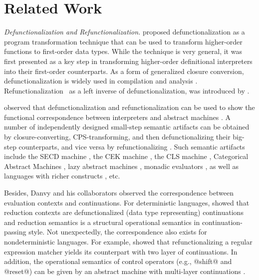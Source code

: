 \documentclass[acmsmall, review]{acmart}\settopmatter{}
\begin{document}
\section{Related Work}\label{sec:related}

\textit{Defunctionalization and Refunctionalization.}
\citet{Reynolds:72} proposed defunctionalization as a program transformation 
technique that can be used to transform higher-order functions to first-order data types. 
While the technique is very general, it was first presented as a key step in
transforming higher-order definitional interpreters into their first-order 
counterparts.
As a form of generalized closure conversion,
defunctionalization is widely used in compilation and analysis \cite{pottier2006polymorphic, 
Eisenberg:2014:PFT:2633357.2633361, fourtounis2014modular, 10.1007/3-540-46425-5_4, consel1993tour}.
Refunctionalization~\cite{Danvy:2006:RW:2171265.2171268} as a 
left inverse of defunctionalization, was introduced 
by \citeauthor{Danvy:2006:RW:2171265.2171268,DANVY2009534}.

 observed that defunctionalization and refunctionalization
can be used to show the functional correspondence between interpreters and abstract machines
\cite{Ager:2003:FCE:888251.888254}. A number of independently designed small-step semantic artifacts can 
be obtained by closure-converting, CPS-transforming, and then defunctionalizing their big-step counterparts, 
and vice versa by refunctionalizing \cite{DANVY2009534}. 
Such semantic artifacts include the SECD machine \cite{10.1007/11431664_4, Ager:2003:FCE:888251.888254, DanvySECDJ},
the CEK machine \cite{Ager:2003:FCE:888251.888254}, the CLS machine  \cite{Ager:2003:FCE:888251.888254},
Categorical Abstract Machines \cite{Ager:2003:FCE:888251.888254}, lazy abstract machines \cite{AGER2004223}, 
monadic evaluators \cite{ager2005functional}, as well as languages with richer constructs
\cite{Danvy:2008:DIP:1411204.1411206, danvy2009towards, biernacka2009towards}, etc.

Besides, Danvy and his collaborators observed the correspondence between evaluation contexts and continuations.
For deterministic languages, \citet{Danvy:2008:DIP:1411204.1411206} showed that reduction contexts
are defunctionalized (data type representing) continuations and reduction semantics is a structural 
operational semantics in continuation-passing style.
Not unexpectedly, the correspondence also exists for nondeterministic languages. For example,
\citet{Danvy:2001:DW:773184.773202} showed that refunctionalizing a regular expression matcher yields
its counterpart with two layer of continuations.
In addition, the operational semantics of control operators (e.g., @shift@ and @reset@) can be given by an 
abstract machine with multi-layer continuations \cite{Danvy:1990:AC:91556.91622, lmcs:2269}. 
\end{document}
